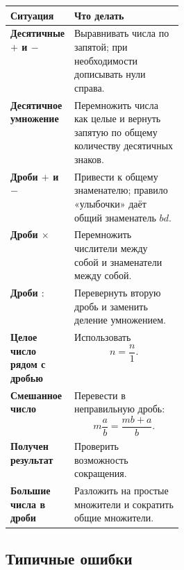 \documentclass[a4paper,12pt]{article}
\begin{document}
\begin{tabularx}
  {\linewidth}
  {@{}>{\bfseries}p{0.29\linewidth}X@{}}

\toprule
Ситуация & Что делать \\
\midrule

Десятичные \(+\) и \(-\)
&
Выравнивать числа по запятой;
при необходимости дописывать нули справа.
\\

Десятичное умножение
&
Перемножить числа как целые
и вернуть запятую по общему количеству
десятичных знаков.
\\

Дроби \(+\) и \(-\)
&
Привести к общему знаменателю;
правило «улыбочки» даёт общий знаменатель \(bd\).
\\

Дроби \(\times\)
&
Перемножить числители между собой
и знаменатели между собой.
\\

Дроби \(:\)
&
Перевернуть вторую дробь
и заменить деление умножением.
\\

Целое число рядом с дробью
&
Использовать
\[
n=\frac n1.
\]
\\

Смешанное число
&
Перевести в неправильную дробь:
\[
m\frac ab=\frac{mb+a}{b}.
\]
\\

Получен результат
&
Проверить возможность сокращения.
\\

Большие числа в дроби
&
Разложить на простые множители
и сократить общие множители.
\\

\bottomrule
\end{tabularx}

\subsection*{Типичные ошибки}
\end{document}
